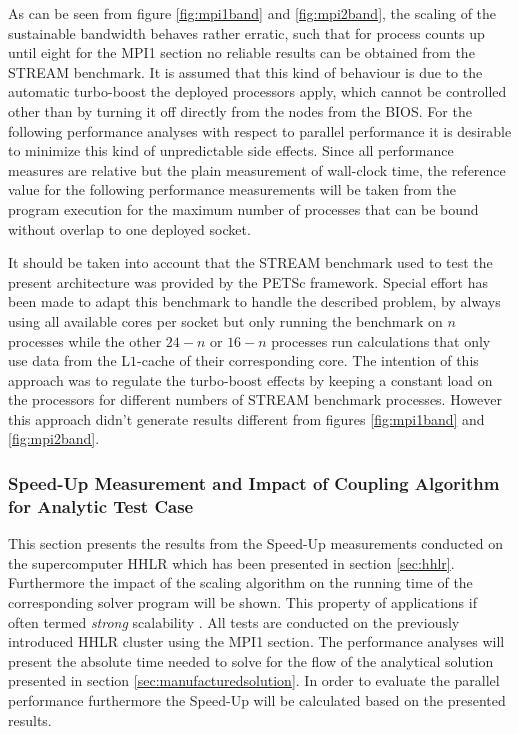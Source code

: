 As can be seen from figure \ref{fig:mpi1band} and \ref{fig:mpi2band}, the scaling of the sustainable bandwidth behaves rather erratic, such that for process counts up until eight for the MPI1 section no reliable results can be obtained from the STREAM benchmark. It is assumed that this kind of behaviour is due to the automatic turbo-boost the deployed processors apply, which cannot be controlled other than by turning it off directly from the nodes from the BIOS. For the following performance analyses with respect to parallel performance it is desirable to minimize this kind of unpredictable side effects. Since all performance measures are relative but the plain measurement of wall-clock time, the reference value for the following performance measurements will be taken from the program execution for the maximum number of processes that can be bound without overlap to one deployed socket.

It should be taken into account that the STREAM benchmark used to test the present architecture was provided by the PETSc framework. Special effort has been made to adapt this benchmark to handle the described problem, by always using all available cores per socket but only running the benchmark on \(n\) processes while the other \(24 - n\) or \(16 - n\) processes run calculations that only use data from the L\(1\)-cache of their corresponding core. The intention of this approach was to regulate the turbo-boost effects by keeping a constant load on the processors for different numbers of STREAM benchmark processes. However this approach didn't generate results different from figures \ref{fig:mpi1band} and \ref{fig:mpi2band}.

\subsubsection{Speed-Up Measurement and Impact of Coupling Algorithm for Analytic Test Case}

This section presents the results from the Speed-Up measurements conducted on the supercomputer HHLR which has been presented in section \ref{sec:hhlr}. Furthermore the impact of the scaling algorithm on the running time of the corresponding solver program will be shown. This property of applications if often termed \emph{strong} scalability \cite{hager11}. All tests are conducted on the previously introduced HHLR cluster using the MPI1 section. The performance analyses will present the absolute time needed to solve for the flow of the analytical solution presented in section \ref{sec:manufacturedsolution}. In order to evaluate the parallel performance furthermore the Speed-Up will be calculated based on the presented results. 

